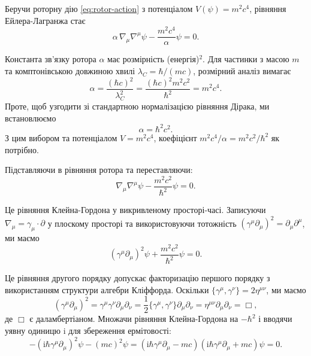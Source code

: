 \documentclass[11pt,a4paper]{article}
\numberwithin{equation}{section}
\theoremstyle{plain}
\theoremstyle{definition}
\theoremstyle{remark}
\newcommand{\ii}{\mathrm{i}}
\begin{document}
Беручи роторну дію \eqref{eq:rotor-action} з потенціалом $V(\psi) = m^2c^4$, рівняння Ейлера-Лагранжа стає
\begin{equation}
\alpha\, \nabla_\mu \nabla^\mu \psi - \frac{m^2c^4}{\alpha}\psi = 0.
\end{equation}

Константа зв'язку ротора $\alpha$ має розмірність (енергія)$^{2}$. Для частинки з масою $m$ та комптонівською довжиною хвилі $\lambda_C = \hbar/(mc)$, розмірний аналіз вимагає
\begin{equation}
\alpha = \frac{(\hbar c)^2}{\lambda_C^2} = \frac{(\hbar c)^2 m^2c^2}{\hbar^2} = m^2c^4.
\end{equation}
Проте, щоб узгодити зі стандартною нормалізацією рівняння Дірака, ми встановлюємо
\begin{equation}
\alpha = \hbar^2c^2.
\end{equation}
З цим вибором та потенціалом $V = m^2c^4$, коефіцієнт $m^2c^4/\alpha = m^2c^2/\hbar^2$ як потрібно.

Підставляючи в рівняння ротора та переставляючи:
\begin{equation}
\nabla_\mu \nabla^\mu \psi - \frac{m^2c^2}{\hbar^2}\psi = 0.
\end{equation}

Це рівняння Клейна-Гордона у викривленому просторі-часі. Записуючи $\nabla_\mu = \gamma_\mu \cdot \partial$ у плоскому просторі та використовуючи тотожність $(\gamma^\mu \partial_\mu)^2 = \partial_\mu \partial^\mu$, ми маємо
\begin{equation}
(\gamma^\mu \partial_\mu)^2 \psi + \frac{m^2c^2}{\hbar^2}\psi = 0.
\end{equation}

Це рівняння другого порядку допускає факторизацію першого порядку з використанням структури алгебри Кліффорда. Оскільки $\{\gamma^\mu, \gamma^\nu\} = 2\eta^{\mu\nu}$, ми маємо
\begin{equation}
(\gamma^\mu \partial_\mu)^2 = \gamma^\mu \gamma^\nu \partial_\mu \partial_\nu = \frac{1}{2}\{\gamma^\mu, \gamma^\nu\}\partial_\mu \partial_\nu = \eta^{\mu\nu}\partial_\mu \partial_\nu = \Box,
\end{equation}
де $\Box$ є даламбертіаном. Множачи рівняння Клейна-Гордона на $-\hbar^2$ і вводячи уявну одиницю $\ii$ для збереження ермітовості:
\begin{equation}
-(\ii\hbar\gamma^\mu \partial_\mu)^2\psi - (mc)^2\psi = (\ii\hbar\gamma^\mu \partial_\mu - mc)(\ii\hbar\gamma^\mu \partial_\mu + mc)\psi = 0.
\end{equation}
\end{document}
